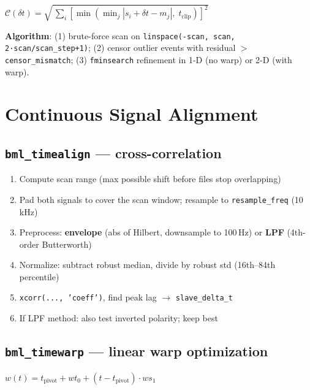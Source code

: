 \documentclass[11pt, a4paper]{article}
\begin{document}
\begin{formulabox}
$\mathcal{C}(\delta t) = \sqrt{\,\displaystyle\sum_{i}\left[\min\!\left(\min_j|s_i+\delta t - m_j|,\;t_{\text{clip}}\right)\right]^2}$
\end{formulabox}

\textbf{Algorithm}: (1) brute-force scan on \texttt{linspace(-scan, scan, 2·scan/scan\_step+1)}; (2) censor outlier events with residual $>$ \texttt{censor\_mismatch}; (3) \texttt{fminsearch} refinement in 1-D (no warp) or 2-D (with warp).

\section{Continuous Signal Alignment}

\subsection{\texttt{bml\_timealign} --- cross-correlation}

\begin{enumerate}
  \item Compute scan range (max possible shift before files stop overlapping)
  \item Pad both signals to cover the scan window; resample to \texttt{resample\_freq} (10\,kHz)
  \item Preprocess: \textbf{envelope} (abs of Hilbert, downsample to 100\,Hz) or \textbf{LPF} (4th-order Butterworth)
  \item Normalize: subtract robust median, divide by robust std (16th--84th percentile)
  \item \texttt{xcorr(..., 'coeff')}, find peak lag $\to$ \texttt{slave\_delta\_t}
  \item If LPF method: also test inverted polarity; keep best
\end{enumerate}

\subsection{\texttt{bml\_timewarp} --- linear warp optimization}

\begin{formulabox}
$w(t) = t_{\text{pivot}} + wt_0 + (t-t_{\text{pivot}})\cdot ws_1$
\end{formulabox}
\end{document}
